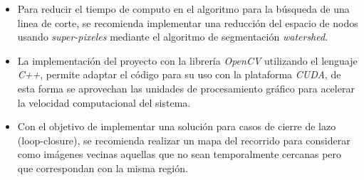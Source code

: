 \begin{itemize}
	\item Para reducir el tiempo de computo en el algoritmo para la búsqueda de una linea de corte, se recomienda implementar una reducción del espacio de nodos usando \textit{super-pixeles} mediante el algoritmo de segmentación \textit{watershed}.
	
	\item La implementación del proyecto con la librería \textit{OpenCV} utilizando el lenguaje \textit{C++}, permite adaptar el código para su uso con la plataforma \textit{CUDA}, de esta forma se aprovechan las unidades de procesamiento gráfico para acelerar la velocidad computacional del sistema.
	
	\item Con el objetivo de implementar una solución para casos de cierre de lazo (loop-closure), se recomienda realizar un mapa del recorrido para considerar como imágenes vecinas aquellas que no sean temporalmente cercanas pero que correspondan con la misma región.
\end{itemize}

